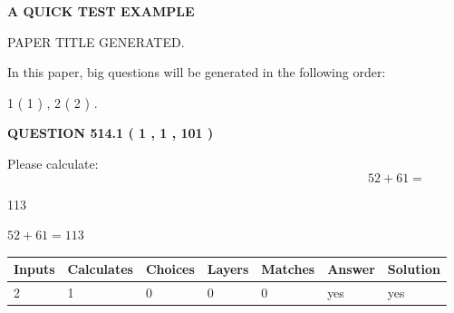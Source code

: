 \documentclass[12pt]{article}
\begin{document}
   
 \vspace{0.2in}
{\LARGE {\textbf{ A QUICK TEST EXAMPLE}}}
   
   
 PAPER TITLE GENERATED.
   
   
   
\vspace{0.2in}
   
In this paper, big questions will be generated in the following order: 
   
   
   1 ( 1 )
 ,
   2 ( 2 )
 .
  
\vspace{0.2in}
  
{\textbf{\Large{QUESTION
514.1 
 ( 1 , 1 , 101 )
}}}
  
  
 
Please calculate:
\begin{equation}
52 +  %
61 = \nonumber
\end{equation}
 
 
 
\noindent{}
 
 

113
 
 
\noindent{}
 
 

 
 
 
\noindent{}
 
 

$ %
52 +  %
61=   %
113$
 
 
\noindent{}
 
 

 
   
   
   
   
\noindent\begin{tabular}{|l|l|l|l|l|l|l|}
 \hline
Inputs & Calculates & Choices & Layers & Matches & Answer & Solution \\ \hline
 2  & 
 1  & 
 0
  & 
 0  & 
 0  & 
  yes & 
  yes 
  \\ \hline
 \end{tabular}
   
   
   
   
\noindent{}
   
\end{document}

